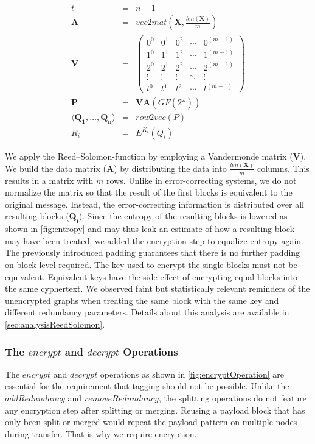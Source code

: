 \begin{eqnarray}
	t          & = & n-1\\%
	\mathbf{A} & = & vec2mat\left(\mathbf{X},\frac{len\left(\mathbf{X}\right)}{m}\right)\\
	\mathbf{V} & = & \left(\begin{matrix}
		0^0 & 0^1 & 0^2 & \cdots & 0^{(m-1)} \\
		1^0 & 1^1 & 1^2 & \cdots & 1^{(m-1)} \\
		2^0 & 2^1 & 2^2 & \cdots & 2^{(m-1)} \\
		\vdots & \vdots & \vdots & \ddots & \vdots \\
		t^0 & t^1 & t^2 & \cdots & t^{(m-1)}
	\end{matrix}\right)\\
	\mathbf{P} & = & \mathbf{V}\mathbf{A} \left(GF\left(2^\omega\right)\right)\\
	\langle \mathbf{Q_1}, \ldots , \mathbf{Q_n} \rangle & = & row2vec(P)\\
	R_i & = & E^{K_i}\left(Q_i\right)
\end{eqnarray}    

We apply the Reed--Solomon-function by employing a Vandermonde matrix ($\mathbf{V}$). We build the data matrix ($\mathbf{A}$) by distributing the data into $\frac{len\left(\mathbf{X}\right)}{m}$ columns. This results in a matrix with $m$ rows. Unlike in error-correcting systems, we do not normalize the matrix so that the result of the first blocks is equivalent to the original message. Instead, the error-correcting information is distributed over all resulting blocks ($\mathbf{Q_i}$). Since the entropy of the resulting blocks is lowered as shown in \cref{fig:entropy} and may thus leak an estimate of how a resulting block may have been treated, we added the encryption step to equalize entropy again. The previously introduced padding guarantees that there is no further padding on block-level required. The key used to encrypt the single blocks must not be equivalent. Equivalent keys have the side effect of encrypting equal blocks into the same cyphertext. We observed faint but statistically relevant reminders of the unencrypted graphs when treating the same block with the same key and different redundancy parameters. Details about this analysis are available in \cref{sec:analysisReedSolomon}.

\subsubsection{The \texorpdfstring{$encrypt$ and $decrypt$}{encrypt and decrypt} Operations}
The $encrypt$ and $decrypt$ operations as shown in \cref{fig:encryptOperation} are essential for the requirement that tagging should not be possible. Unlike the $addRedundancy$ and $removeRedundancy$, the splitting operations do not feature any encryption step after splitting or merging. Reusing a payload block that has only been split or merged would repeat the payload pattern on multiple nodes during transfer. That is why we require encryption.

